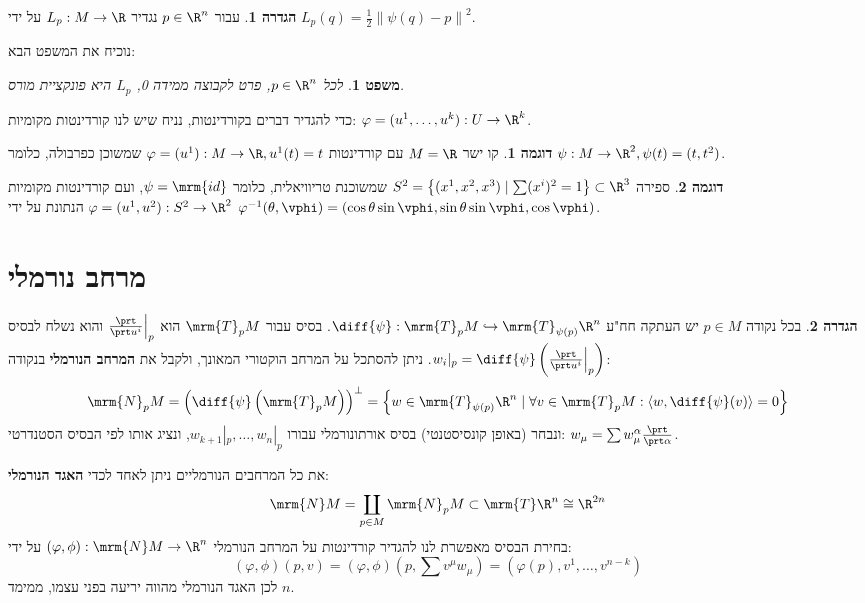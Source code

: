 \documentclass{article}
\newtheorem{theorem}{משפט}
\theoremstyle{definition}
\newtheorem*{definition*}{הגדרה}
\newtheorem*{example*}{דוגמה}
\newcommand{\norm}[1]{\left\lVert#1\right\rVert}
\begin{document}
	\begin{definition*}
		עבור
		\(p\in \R^n\)
		נגדיר
		\(L_p:M\to \R\)
		על ידי
		\(L_p(q)=\frac{1}{2}\norm{\psi(q)-p}^2\).
	\end{definition*}

	נוכיח את המשפט הבא:
	\begin{theorem}\label{main-thm}
		לכל
		\(p\in \R^n\),
		פרט לקבוצה ממידה 0, \(L_p\) היא פונקציית מורס.
	\end{theorem}

	כדי להגדיר דברים בקורדינטות, נניח שיש לנו קורדינטות מקומיות:
	\(\varphi=(u^1,\dotsc,u^k): U \to \R^k\).
	
	\begin{example*}
		קו ישר
		\(M = \R\)
		עם קורדינטות
		\(\varphi=(u^1): M \to \R, u^1(t)=t\)
		שמשוכן כפרבולה, כלומר
		\(\psi: M \to \R^2, \psi(t) = (t,t^2)\).
	\end{example*}
	
	\begin{example*}
		ספירה
		\(S^2 = \left\{(x^1,x^2,x^3) \mid \sum (x^i)^2 = 1 \right\} \subset \R^3 \)
		שמשוכנת טריוויאלית, כלומר
		\(\psi = \mrm{id}\),
		ועם קורדינטות מקומיות
		\(\varphi=(u^1,u^2): S^2 \to \R^2\)
		הנתונת על ידי
		\(
			\varphi^{-1}(\theta, \vphi) = \left(
				\cos\theta \sin\vphi,
				\sin\theta \sin\vphi,
				\cos\vphi
			\right)
		\).
	\end{example*}




	\section{מרחב נורמלי}
	
	\begin{definition*}
		בכל נקודה
		$p\in M$
		יש העתקה חח"ע
		\(\diff{\psi}: \mrm{T}_p M \hookrightarrow \mrm{T}_{\psi(p)} \R^n\).
		בסיס עבור
		\(\mrm{T}_p M\)
		הוא
		\(\frac{\prt}{\prt u^i}\Big|_p\)
		והוא נשלח לבסיס
		\(w_i|_p=\diff{\psi}\left(\frac{\prt}{\prt u^i}\Big|_p\right)\).
		ניתן להסתכל על המרחב הוקטורי המאונך, ולקבל את \textbf{המרחב הנורמלי} בנקודה:
		\[
			\mrm{N}_p M
			= \left(\diff{\psi}\left(\mrm{T}_p M\right)\right)^\bot
			= \left\{
				w \in \mrm{T}_{\psi(p)} \R^n
				\mid
				\forall v \in \mrm{T}_p M: \langle w,\diff{\psi}(v) \rangle=0
			\right\}
		\]
		ונבחר (באופן קונסיסטנטי) בסיס אורתונורמלי עבורו
		\(w_{k+1}|_p,\dotsc,w_{n}|_p\),
		ונציג אותו לפי הבסיס הסטנדרטי:
		\(w_\mu = \sum w^\alpha_\mu \frac{\prt}{\prt \alpha}\).
		
		את כל המרחבים הנורמליים ניתן לאחד לכדי \textbf{האגד הנורמלי}:
		\[
			\mrm{N} M
			= \coprod_{p \in M} \mrm{N}_p M
			\subset \mrm{T} \R^n
			\cong \R^{2n}
		\]
		בחירת הבסיס מאפשרת לנו להגדיר קורדינטות על המרחב הנורמלי
		\((\varphi,\phi): \mrm{N} M \to \R^n\)
		על ידי:
		\[
			(\varphi,\phi)(p,v)
			= (\varphi,\phi)(p,\sum v^\mu w_\mu)
			= (\varphi(p),v^1,\dotsc,v^{n-k})
		\]
		לכן האגד הנורמלי מהווה יריעה בפני עצמו, ממימד \(n\).
	\end{definition*}
\end{document}
